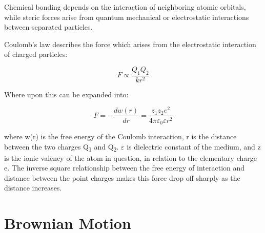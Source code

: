 Chemical bonding depends on the interaction of neighboring atomic orbitals, while steric forces arise from quantum mechanical or electrostatic interactions between separated particles. %


Coulomb's %
law %
describes the force %
which arises from the electrostatic interaction of charged particles:



\begin{equation}
F \propto \frac{Q_1 Q_2}{kr^2}
\end{equation}

Where upon this can be expanded into:

\begin{equation} %
F = -\frac{dw(r)}{dr} =  \frac{z_1z_2e^2}{4\pi\varepsilon_0\varepsilon r^2}
\end{equation}

where w(r) is the free energy of the Coulomb interaction, r is the distance between the two charges Q\textsubscript{1} and Q\textsubscript{2}. $\varepsilon$ is dielectric constant of the medium, and z is the ionic valency of the atom in question, in relation to the elementary charge e. %
The inverse square relationship between the free energy of interaction and distance between the point charges makes this force drop off sharply as the distance increases.



\section{Brownian Motion}

